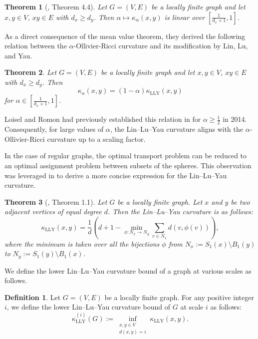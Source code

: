 \documentclass[11pt,bezier]{article}
\newtheorem{theorem}{Theorem}[section]
\theoremstyle{definition}
\newtheorem{defi}{Definition}[section]
\theoremstyle{definition}
\theoremstyle{nonumber}
\begin{document}
\begin{theorem}[\cite{Bourne}, Theorem 4.4]
Let $G = (V, E)$ be a locally finite graph and let $x, y \in V$, $xy \in E$ with $d_x \geq d_y$. Then $\alpha \mapsto \kappa_\alpha(x, y)$ is linear over $\left[ \frac{1}{d_x+1}, 1 \right]$.
\end{theorem}

As a direct consequence of the mean value theorem, they derived the following relation between the $\alpha$-Ollivier-Ricci curvature and its modification by Lin, Lu, and Yau.

\begin{theorem}\label{relation}
Let $G = (V, E)$ be a locally finite graph and let $x, y \in V$, $xy \in E$ with $d_x \geq d_y$. Then
$$
\kappa_\alpha(x, y) = (1-\alpha)\kappa_{\mathrm{LLY}}(x, y)
$$
for $\alpha \in \left[ \frac{1}{d_x+1}, 1 \right]$.
\end{theorem}

Loisel and Romon had previously established this relation in \cite{Loisel} for $\alpha \geq \frac{1}{2}$ in 2014.
Consequently, for large values of $\alpha$, the Lin--Lu--Yau curvature aligns with the $\alpha$-Ollivier-Ricci curvature up to a scaling factor.

In the case of regular graphs, the optimal transport problem can be reduced to an optimal assignment problem between subsets of the spheres. This observation was leveraged in \cite{Hehl} to derive a more concise expression for the Lin--Lu--Yau curvature.

\begin{theorem}[\cite{Hehl}, Theorem 1.1]\label{equal degree}
Let $G$ be a locally finite graph. Let $x$ and $y$ be two adjacent vertices of equal degree $d$. Then the Lin--Lu--Yau curvature is as follows:
$$
\kappa_{\mathrm{LLY}}(x, y) = \frac{1}{d} \left( d + 1 - \min_{\phi: N_x \to N_y} \sum_{v \in N_x} d(v, \phi(v)) \right),
$$
where the minimum is taken over all the bijections $\phi$ from $N_x := S_1(x) \setminus B_1(y)$ to $N_y := S_1(y) \setminus B_1(x)$.
\end{theorem}

We define the lower Lin--Lu--Yau curvature bound of a graph at various scales as follows.

\begin{defi}
Let $G = (V, E)$ be a locally finite graph. For any positive integer $i$, we define the lower Lin--Lu--Yau curvature bound of $G$ at scale $i$ as follows:
$$
\kappa_{\mathrm{LLY}}^{(i)}(G) := \inf_{\substack{x, y \in V \\ d(x, y) = i}} \kappa_{\mathrm{LLY}}(x, y).
$$
\end{defi} 
\end{document}
